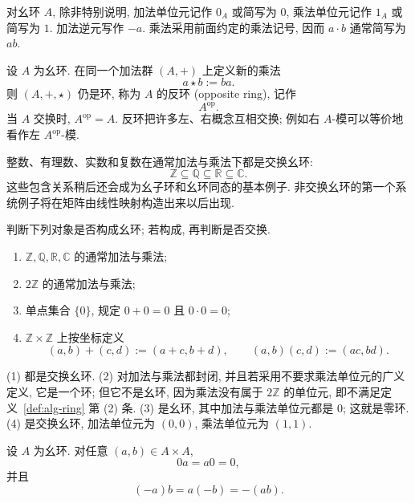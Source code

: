 \documentclass[usesamecnt, thmcnt=section, lang=cn, newtx, 10pt, scheme=chinese]{elegantbook}
\begin{document}
\begin{notation}[幺环的加法与乘法记号]
对幺环 $A$, 除非特别说明, 加法单位元记作 $0_A$ 或简写为 $0$, 乘法单位元记作 $1_A$ 或简写为 $1$. 加法逆元写作 $-a$. 乘法采用前面约定的乘法记号, 因而 $a\cdot b$ 通常简写为 $ab$.
\end{notation}

\begin{definition}[反环]\label{def:alg-opposite-ring}
设 $A$ 为幺环. 在同一个加法群 $(A,+)$ 上定义新的乘法
\[
 a\star b:=ba.
\]
则 $(A,+,\star)$ 仍是环, 称为 $A$ 的{\color{blue}反环 (opposite ring)}, 记作
\[
 A^{\operatorname{op}}.
\]
当 $A$ 交换时, $A^{\operatorname{op}}=A$. 反环把许多左、右概念互相交换; 例如右 $A$-模可以等价地看作左 $A^{\operatorname{op}}$-模.
\end{definition}

\begin{instance}
整数、有理数、实数和复数在通常加法与乘法下都是交换幺环:
\[
 \mathbb Z\subseteq\mathbb Q\subseteq\mathbb R\subseteq\mathbb C.
\]
这些包含关系稍后还会成为幺子环和幺环同态的基本例子. 非交换幺环的第一个系统例子将在矩阵由线性映射构造出来以后出现.
\end{instance}



\begin{concept}\label{con:alg-ring-01}
判断下列对象是否构成幺环; 若构成, 再判断是否交换.
\begin{enumerate}[label=\rm(\arabic*)]
  \item $\mathbb Z,\mathbb Q,\mathbb R,\mathbb C$ 的通常加法与乘法;
  \item $2\mathbb Z$ 的通常加法与乘法;
  \item 单点集合 $\{0\}$, 规定 $0+0=0$ 且 $0\cdot0=0$;
  \item $\mathbb Z\times\mathbb Z$ 上按坐标定义
  \[
   (a,b)+(c,d):=(a+c,b+d),
   \qquad
   (a,b)(c,d):=(ac,bd).
  \]
\end{enumerate}
\end{concept}

\begin{solution}
(1) 都是交换幺环. (2) 对加法与乘法都封闭, 并且若采用不要求乘法单位元的广义定义, 它是一个环; 但它不是幺环, 因为乘法没有属于 $2\mathbb Z$ 的单位元, 即不满足定义~\ref{def:alg-ring} 第 (2) 条. (3) 是幺环, 其中加法与乘法单位元都是 $0$; 这就是零环. (4) 是交换幺环, 加法单位元为 $(0,0)$, 乘法单位元为 $(1,1)$.
\end{solution}

\begin{proposition}\label{prop:alg-ring-zero-minus}
设 $A$ 为幺环. 对任意 $(a,b)\in A\times A$,
\[
 0a=a0=0,
\]
并且
\[
 (-a)b=a(-b)=-(ab).
\]
\end{proposition}
\end{document}

